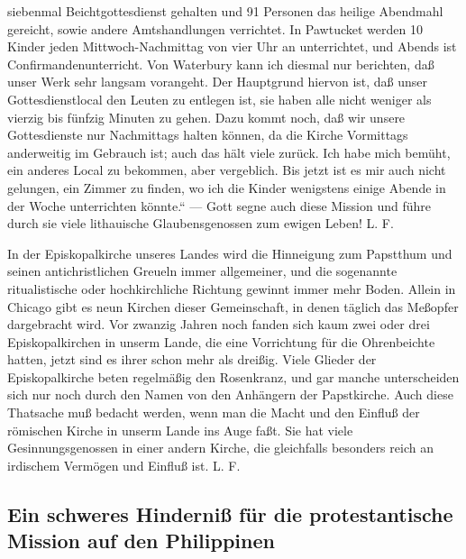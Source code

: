 siebenmal Beichtgottesdienst gehalten und 91 Personen das heilige Abendmahl gereicht, sowie andere Amtshandlungen verrichtet. In Pawtucket werden 10 Kinder jeden Mittwoch-Nachmittag von vier Uhr an unterrichtet, und Abends ist Confirmandenunterricht. Von Waterbury kann ich diesmal nur berichten, daß unser Werk sehr langsam vorangeht. Der Hauptgrund hiervon ist, daß unser Gottesdienstlocal den Leuten zu entlegen ist, sie haben alle nicht weniger als vierzig bis fünfzig Minuten zu gehen. Dazu kommt noch, daß wir unsere Gottesdienste nur Nachmittags halten können, da die Kirche Vormittags anderweitig im Gebrauch ist; auch das hält viele zurück. Ich habe mich bemüht, ein anderes Local zu bekommen, aber vergeblich. Bis jetzt ist es mir auch nicht gelungen, ein Zimmer zu finden, wo ich die Kinder wenigstens einige Abende in der Woche unterrichten könnte.“ — Gott segne auch diese Mission und führe durch sie viele lithauische Glaubensgenossen zum ewigen Leben! L. F.

In der Episkopalkirche unseres Landes wird die Hinneigung zum Papstthum und seinen antichristlichen Greueln immer allgemeiner, und die sogenannte ritualistische oder hochkirchliche Richtung gewinnt immer mehr Boden. Allein in Chicago gibt es neun Kirchen dieser Gemeinschaft, in denen täglich das Meßopfer dargebracht wird. Vor zwanzig Jahren noch fanden sich kaum zwei oder drei Episkopalkirchen in unserm Lande, die eine Vorrichtung für die Ohrenbeichte hatten, jetzt sind es ihrer schon mehr als dreißig. Viele Glieder der Episkopalkirche beten regelmäßig den Rosenkranz, und gar manche unterscheiden sich nur noch durch den Namen von den Anhängern der Papstkirche. Auch diese Thatsache muß bedacht werden, wenn man die Macht und den Einfluß der römischen Kirche in unserm Lande ins Auge faßt. Sie hat viele Gesinnungsgenossen in einer andern Kirche, die gleichfalls besonders reich an irdischem Vermögen und Einfluß ist. L. F.

\subsection{Ein schweres Hinderniß für die protestantische Mission auf den Philippinen}

